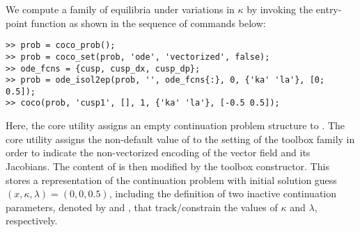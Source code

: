 We compute a family of equilibria under variations in $\kappa$ by invoking the  entry-point function as shown in the sequence of commands below:
\begin{lstlisting}[language=coco-highlight]
>> prob = coco_prob();
>> prob = coco_set(prob, 'ode', 'vectorized', false);
>> ode_fcns = {cusp, cusp_dx, cusp_dp};
>> prob = ode_isol2ep(prob, '', ode_fcns{:}, 0, {'ka' 'la'}, [0; 0.5]);
>> coco(prob, 'cusp1', [], 1, {'ka' 'la'}, [-0.5 0.5]);
\end{lstlisting}
Here, the  core utility assigns an empty continuation problem structure to . The  core utility assigns the non-default value of  to the  setting of the  toolbox family in order to indicate the non-vectorized encoding of the vector field and its Jacobians. The content of  is then modified by the  toolbox constructor. This stores a representation of the continuation problem with initial solution guess $(x,\kappa,\lambda)=(0,0,0.5)$, including the definition of two inactive continuation parameters, denoted by  and , that track/constrain the values of $\kappa$ and $\lambda$, respectively.

